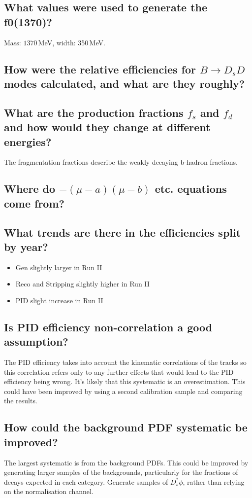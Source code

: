 \documentclass[12pt]{article}
\begin{document}
\subsection{What values were used to generate the f0(1370)?}
Mass: $1370\,$MeV, width: 350\,MeV.

\subsection{How were the relative efficiencies for $B\rightarrow D_s D$ modes calculated, and what are they roughly?}


\subsection{What are the production fractions $f_{s}$ and $f_{d}$ and how would they change at different energies?}

The fragmentation fractions describe the weakly decaying b-hadron fractions. 

\subsection{Where do $-(\mu - a)(\mu - b)$ etc. equations come from?}

\subsection{What trends are there in the efficiencies split by year?}
\begin{itemize}
\item Gen slightly larger in Run II
\item Reco and Stripping slightly higher in Run II
\item PID slight increase in Run II
\end{itemize}

\subsection{Is PID efficiency non-correlation a good assumption?}
The PID efficiency takes into account the kinematic correlations of the tracks so this correlation refers only to any further effects that would lead to the PID efficiency being wrong. It's likely that this systematic is an overestimation. This could have been improved by using a second calibration sample and comparing the results. 


\subsection{How could the background PDF systematic be improved?}
The largest systematic is from the background PDFs. This could be improved by generating larger samples of the backgrounds, particularly for the fractions of decays expected in each category. Generate samples of $D_s^* \phi$, rather than relying on the normalisation channel. 
\end{document}
